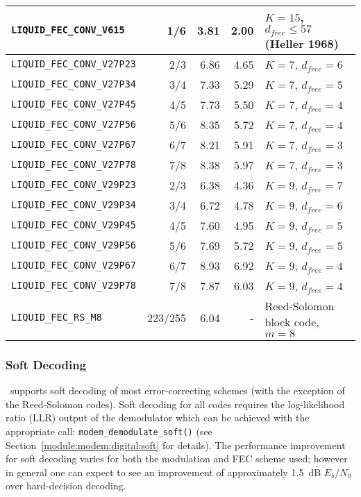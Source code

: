 \begin{table*}
{\begin{tabular*}{0.95\textwidth}{l@{\extracolsep{\fill}}rrrl}
{\tt LIQUID\_FEC\_CONV\_V615}   & 1/6     &  3.81 & 2.00 & $K=15$, $d_{free}\leq57$ (Heller 1968)\\\midrule
%
{\tt LIQUID\_FEC\_CONV\_V27P23} & 2/3     &  6.86 & 4.65 & $K=7$, $d_{free}=6$\\
{\tt LIQUID\_FEC\_CONV\_V27P34} & 3/4     &  7.33 & 5.29 & $K=7$, $d_{free}=5$\\
{\tt LIQUID\_FEC\_CONV\_V27P45} & 4/5     &  7.73 & 5.50 & $K=7$, $d_{free}=4$\\
{\tt LIQUID\_FEC\_CONV\_V27P56} & 5/6     &  8.35 & 5.72 & $K=7$, $d_{free}=4$\\
{\tt LIQUID\_FEC\_CONV\_V27P67} & 6/7     &  8.21 & 5.91 & $K=7$, $d_{free}=3$\\
{\tt LIQUID\_FEC\_CONV\_V27P78} & 7/8     &  8.38 & 5.97 & $K=7$, $d_{free}=3$\\\midrule
%
{\tt LIQUID\_FEC\_CONV\_V29P23} & 2/3     &  6.38 & 4.36 & $K=9$, $d_{free}=7$\\
{\tt LIQUID\_FEC\_CONV\_V29P34} & 3/4     &  6.72 & 4.78 & $K=9$, $d_{free}=6$\\
{\tt LIQUID\_FEC\_CONV\_V29P45} & 4/5     &  7.60 & 4.95 & $K=9$, $d_{free}=5$\\
{\tt LIQUID\_FEC\_CONV\_V29P56} & 5/6     &  7.69 & 5.72 & $K=9$, $d_{free}=5$\\
{\tt LIQUID\_FEC\_CONV\_V29P67} & 6/7     &  8.93 & 6.92 & $K=9$, $d_{free}=4$\\
{\tt LIQUID\_FEC\_CONV\_V29P78} & 7/8     &  7.87 & 6.03 & $K=9$, $d_{free}=4$\\\midrule
% 
{\tt LIQUID\_FEC\_RS\_M8}       & 223/255 &  6.04 &    - & Reed-Solomon block code, $m=8$\\\bottomrule


\end{tabular*}
}
\end{table*}%

\subsubsection{Soft Decoding}
\label{module:fec:soft}
\liquid\ supports soft decoding of most error-correcting schemes
(with the exception of the Reed-Solomon codes).
Soft decoding for all codes requires the log-likelihood ratio (LLR)
output of the demodulator which can be achieved with the appropriate
call: {\tt modem\_demodulate\_soft()}
(see Section~\ref{module:modem:digital:soft} for details).
The performance improvement for soft decoding varies for both the
modulation and FEC scheme used;
however in general one can expect to see an improvement of approximately
1.5~dB $E_b/N_0$ over hard-decision decoding.


